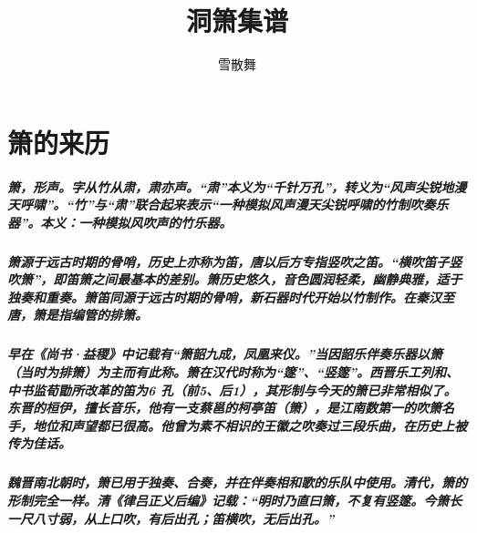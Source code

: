 \documentclass[cn,pad,chinese,chinesefont=nofont,math=newtx]{elegantbook}
\title{洞箫集谱}
\author{雪散舞}
\date{\zhtoday}
\begin{document}
\maketitle
\frontmatter
\tableofcontents
\mainmatter

\chapter{箫的来历}
\paragraph*{箫，形声。字从竹从肃，肃亦声。“肃”本义为“千针万孔”，转义为“风声尖锐地漫天呼啸”。“竹”与“肃”联合起来表示“一种模拟风声漫天尖锐呼啸的竹制吹奏乐器”。本义：一种模拟风吹声的竹乐器。}
\paragraph*{箫源于远古时期的骨哨，历史上亦称为笛，唐以后方专指竖吹之笛。“横吹笛子竖吹箫”，即笛箫之间最基本的差别。箫历史悠久，音色圆润轻柔，幽静典雅，适于独奏和重奏。箫笛同源于远古时期的骨哨，新石器时代开始以竹制作。在秦汉至唐，箫是指编管的排箫。} 
\paragraph*{早在《尚书·益稷》中记载有“箫韶九成，凤凰来仪。”当因韶乐伴奏乐器以箫（当时为排箫）为主而有此称。箫在汉代时称为“篴”、“竖篴”。西晋乐工列和、中书监荀勖所改革的笛为6 孔（前5、后1），其形制与今天的箫已非常相似了。东晋的桓伊，擅长音乐，他有一支蔡邕的柯亭笛（箫），是江南数第一的吹箫名手，地位和声望都已很高。他曾为素不相识的王徽之吹奏过三段乐曲，在历史上被传为佳话。}
\paragraph*{魏晋南北朝时，箫已用于独奏、合奏，并在伴奏相和歌的乐队中使用。清代，箫的形制完全一样。清《律吕正义后编》记载：“明时乃直曰箫，不复有竖篴。今箫长一尺八寸弱，从上口吹，有后出孔；笛横吹，无后出孔。”}
\end{document}
